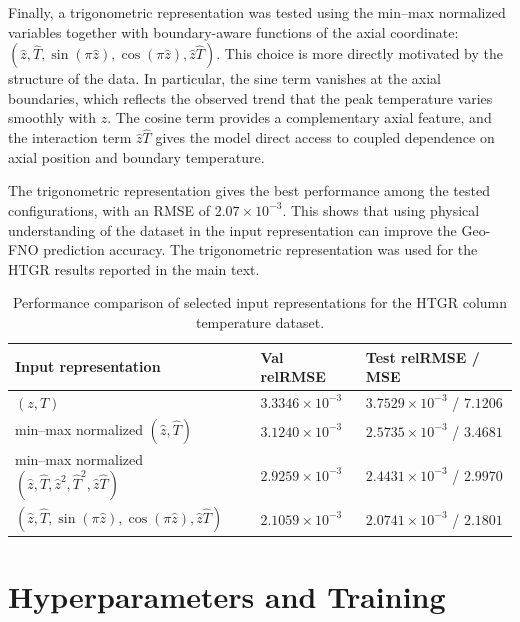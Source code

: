 Finally, a trigonometric representation was tested using the min--max
normalized variables together with boundary-aware functions of the axial
coordinate:
$(\hat z, \hat T, \sin(\pi\hat z),
\cos(\pi\hat z), \hat z\hat T)$. This choice is more directly motivated by the
structure of the data. In particular, the sine term vanishes at the
axial boundaries, which reflects the observed trend that the peak
temperature varies smoothly with $z$. The cosine term provides a complementary axial feature, and
the interaction term $\hat z\hat T$ gives the model direct access to
coupled dependence on axial position and boundary temperature.

The trigonometric representation gives the best performance among the
tested configurations, with an RMSE of
$2.07 \times 10^{-3}$. This shows that using physical understanding
of the dataset in the input representation can improve the Geo-FNO
prediction accuracy. The trigonometric representation
was used for the HTGR results reported in the main text.

\begin{table}[t]
    \centering
    \caption{\label{tab:htgr-input-engineering} Performance comparison
    of selected input representations for the HTGR column temperature
    dataset.}
    \begin{tabular}{lll}
        \hline
        Input representation & Val relRMSE  & Test relRMSE / MSE \\
        \hline
        $(z, T)$ &
        $3.3346 \times 10^{-3}$  &
        $3.7529 \times 10^{-3}$ / $7.1206$ \\

        min--max normalized $(\hat z, \hat T)$ &
        $3.1240 \times 10^{-3}$  &
        $2.5735 \times 10^{-3}$ / $3.4681$ \\

        min--max normalized
        $(\hat z, \hat T, \hat z^2, \hat T^2, \hat z\hat T)$ &
        $2.9259 \times 10^{-3}$  &
        $2.4431 \times 10^{-3}$ / $2.9970$ \\

        $(\hat z, \hat T, \sin(\pi \hat z),
        \cos(\pi \hat z), \hat z\hat T)$ &
        $2.1059 \times 10^{-3}$ &
        $2.0741 \times 10^{-3}$ / $2.1801$ \\
        \hline
    \end{tabular}
\end{table}


\chapter{Hyperparameters and Training }\label{appendix:hyperparameters}

